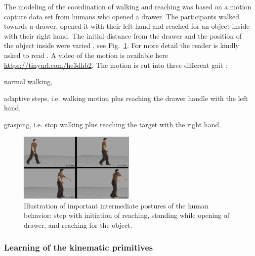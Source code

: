 The modeling of the coordination of walking and reaching was based on a motion
capture data set from humans who opened a drawer. The participants walked
towards a drawer, opened it with their left hand and reached for an object
inside with their right hand. The initial distance from the drawer and the position
of the object inside were varied \cite{ref:mlsg15}, see Fig.~\ref{fig:real}.
For more detail the reader is kindly asked to read \cite{mukovskiy:jras:2016}.
A video of the motion is available here \url{https://tinyurl.com/he3dhb2}.
The motion is cut into three different gait :
\begin{list}{ .}{%
		\setlength{\topsep}{5pt}%
		\setlength{\itemsep}{0pt}%
		\setlength{\parsep}{0pt}%
		\setlength{\labelwidth}{3.em}%
		\setlength{\leftmargin}{2em}%
		\setlength{\labelsep}{0.5em}%
	}
\item normal walking,
\item adaptive steps, i.e. walking motion plus reaching the drawer handle with the left hand,
\item grasping, i.e. stop walking plus reaching the target with the right hand.
\end{list}
\begin{figure}[ht]
  \centering
  \includegraphics[width=0.5\textwidth]{realavatar.jpg}
  \caption{Illustration of important intermediate postures of the human behavior:
    step with initiation of reaching, standing while opening of drawer, and reaching for the  object.}
\label{fig:real}
\end{figure}

\subsubsection*{Learning of the kinematic primitives}
\label{sc:Modeling}

